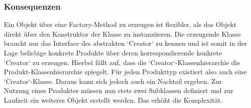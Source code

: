 \subsubsection*{Konsequenzen}
Ein Objekt über eine Factory-Method zu erzeugen ist flexibler, als das Objekt direkt über den Konstruktor der Klasse zu instanziieren. Die erzeugende Klasse braucht nur das Interface des abstrakten `Creator` zu kennen und ist somit in der Lage beliebige konkrete Produkte über  deren korrespondierende konkrete `Creator` zu erzeugen. Hierbei fällt auf, dass die `Creator`-Klassenhierarchie die Produkt-Klassenhierarchie spiegelt. Für jeden Produkttyp existiert also auch eine `Creator`-Klasse. Daraus kann sich jedoch auch ein Nachteil ergeben. Zur Nutzung eines Produktes müssen nun stets zwei Subklassen definiert und zur Laufzeit ein weiteres Objekt erstellt werden. Das erhöht die Komplexität. 

